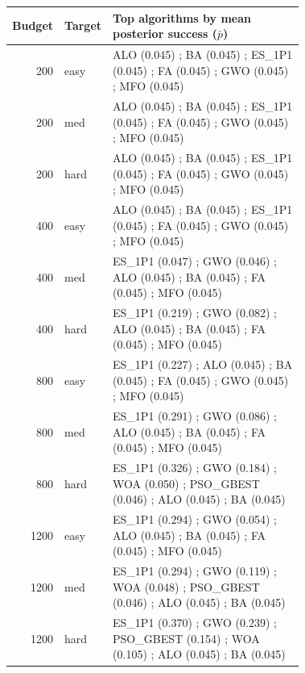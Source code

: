 \begin{tabular}{r l p{0.72\linewidth}}
\hline
Budget & Target & Top algorithms by mean posterior success ($\bar{p}$) \\
\hline
200 & easy & ALO (0.045) ; BA (0.045) ; ES_1P1 (0.045) ; FA (0.045) ; GWO (0.045) ; MFO (0.045) \\
200 & med & ALO (0.045) ; BA (0.045) ; ES_1P1 (0.045) ; FA (0.045) ; GWO (0.045) ; MFO (0.045) \\
200 & hard & ALO (0.045) ; BA (0.045) ; ES_1P1 (0.045) ; FA (0.045) ; GWO (0.045) ; MFO (0.045) \\
400 & easy & ALO (0.045) ; BA (0.045) ; ES_1P1 (0.045) ; FA (0.045) ; GWO (0.045) ; MFO (0.045) \\
400 & med & ES_1P1 (0.047) ; GWO (0.046) ; ALO (0.045) ; BA (0.045) ; FA (0.045) ; MFO (0.045) \\
400 & hard & ES_1P1 (0.219) ; GWO (0.082) ; ALO (0.045) ; BA (0.045) ; FA (0.045) ; MFO (0.045) \\
800 & easy & ES_1P1 (0.227) ; ALO (0.045) ; BA (0.045) ; FA (0.045) ; GWO (0.045) ; MFO (0.045) \\
800 & med & ES_1P1 (0.291) ; GWO (0.086) ; ALO (0.045) ; BA (0.045) ; FA (0.045) ; MFO (0.045) \\
800 & hard & ES_1P1 (0.326) ; GWO (0.184) ; WOA (0.050) ; PSO_GBEST (0.046) ; ALO (0.045) ; BA (0.045) \\
1200 & easy & ES_1P1 (0.294) ; GWO (0.054) ; ALO (0.045) ; BA (0.045) ; FA (0.045) ; MFO (0.045) \\
1200 & med & ES_1P1 (0.294) ; GWO (0.119) ; WOA (0.048) ; PSO_GBEST (0.046) ; ALO (0.045) ; BA (0.045) \\
1200 & hard & ES_1P1 (0.370) ; GWO (0.239) ; PSO_GBEST (0.154) ; WOA (0.105) ; ALO (0.045) ; BA (0.045) \\
\hline
\end{tabular}
